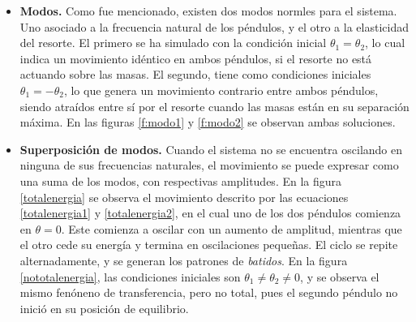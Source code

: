 \documentclass[%
 aip,
rsi,%
 amsmath,amssymb,
 reprint,%
]{revtex4-1}
\begin{document}
\begin{itemize}
    \item{\textbf{Modos.}} Como fue mencionado, existen dos modos normles para el sistema. Uno asociado a la frecuencia natural de los p\'endulos, y el otro a la elasticidad del resorte. El primero se ha simulado con la condici\'on inicial $\theta_1=\theta_2$, lo cual indica un movimiento id\'entico en ambos p\'endulos, si el resorte no est\'a actuando sobre las masas. El segundo, tiene como condiciones iniciales $\theta_1=-\theta_2$, lo que genera un movimiento contrario entre ambos p\'endulos, siendo atra\'idos entre s\'i por el resorte cuando las masas est\'an en su separaci\'on m\'axima. En las figuras \ref{f:modo1} y \ref{f:modo2} se observan ambas soluciones.
    
    
    \begin{figure}
    
\end{figure}

    \item{\textbf{Superposici\'on de modos.}} Cuando el sistema no se encuentra oscilando en ninguna de sus frecuencias naturales, el movimiento se puede expresar como una suma de los modos, con respectivas amplitudes. En la figura \ref{totalenergia} se observa el movimiento descrito por las ecuaciones \ref{totalenergia1} y \ref{totalenergia2}, en el cual uno de los dos p\'endulos comienza en $\theta=0$. Este comienza a oscilar con un aumento de amplitud, mientras que el otro cede su energ\'ia y termina en oscilaciones peque\~nas. El ciclo se repite alternadamente, y se generan los patrones de \textit{batidos}. En la figura \ref{nototalenergia}, las condiciones iniciales son $\theta_1\neq\theta_2\neq0$, y se observa el mismo fen\'oneno de transferencia, pero no total, pues el segundo p\'endulo no inici\'o en su posici\'on de equilibrio.
    
    
    
    \begin{figure}
\end{figure}
\end{itemize}
\end{document}
